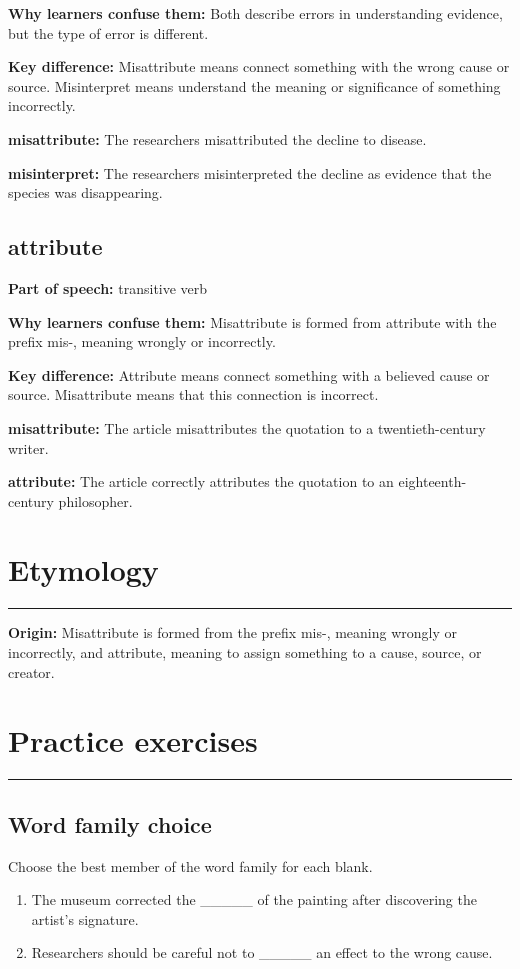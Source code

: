 \documentclass[11pt]{article}
\newcommand{\sectionrule}{\par\vspace{-0.5em}\noindent\textcolor{Accent}{\rule{\linewidth}{0.6pt}}\par}
\begin{document}
\textbf{Why learners confuse them:} Both describe errors in understanding evidence, but the type of error is different.

\textbf{Key difference:} Misattribute means connect something with the wrong cause or source. Misinterpret means understand the meaning or significance of something incorrectly.

\textbf{misattribute:} The researchers misattributed the decline to disease.

\textbf{misinterpret:} The researchers misinterpreted the decline as evidence that the species was disappearing.

\subsection{attribute}
\textbf{Part of speech:} transitive verb

\textbf{Why learners confuse them:} Misattribute is formed from attribute with the prefix mis-, meaning wrongly or incorrectly.

\textbf{Key difference:} Attribute means connect something with a believed cause or source. Misattribute means that this connection is incorrect.

\textbf{misattribute:} The article misattributes the quotation to a twentieth-century writer.

\textbf{attribute:} The article correctly attributes the quotation to an eighteenth-century philosopher.

\section{Etymology}
\sectionrule
\textbf{Origin:} Misattribute is formed from the prefix mis-, meaning wrongly or incorrectly, and attribute, meaning to assign something to a cause, source, or creator.

\section{Practice exercises}
\sectionrule
\subsection{Word family choice}
Choose the best member of the word family for each blank.

\begin{enumerate}
  \item The museum corrected the \_\_\_\_\_ of the painting after discovering the artist's signature.
  \item Researchers should be careful not to \_\_\_\_\_ an effect to the wrong cause.
\end{enumerate}
\end{document}
